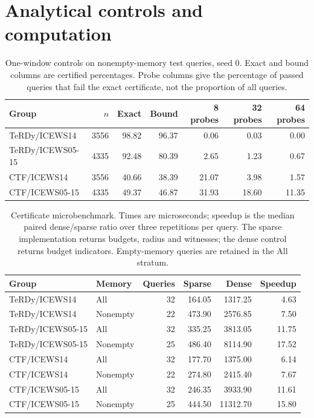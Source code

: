 \section{Analytical controls and computation}
\begin{table}[H]\centering\small\caption{One-window controls on nonempty-memory test queries, seed 0. Exact and bound columns are certified percentages. Probe columns give the percentage of passed queries that fail the exact certificate, not the proportion of all queries.}\begin{tabular}{lrrrrrr}\toprule Group & $n$ & Exact & Bound & 8 probes & 32 probes & 64 probes\\\midrule
TeRDy/ICEWS14 & 3556 & 98.82 & 96.37 & 0.06 & 0.03 & 0.00\\
TeRDy/ICEWS05-15 & 4335 & 92.48 & 80.39 & 2.65 & 1.23 & 0.67\\
CTF/ICEWS14 & 3556 & 40.66 & 38.39 & 21.07 & 3.98 & 1.57\\
CTF/ICEWS05-15 & 4335 & 49.37 & 46.87 & 31.93 & 18.60 & 11.35\\
\bottomrule\end{tabular}\end{table}
\begin{table}[H]\centering\small\caption{Certificate microbenchmark. Times are microseconds; speedup is the median paired dense/sparse ratio over three repetitions per query. The sparse implementation returns budgets, radius and witnesses; the dense control returns budget indicators. Empty-memory queries are retained in the All stratum.}\begin{tabular}{llrrrr}\toprule Group & Memory & Queries & Sparse & Dense & Speedup\\\midrule
TeRDy/ICEWS14 & All & 32 & 164.05 & 1317.25 & 4.63\\
TeRDy/ICEWS14 & Nonempty & 22 & 473.90 & 2576.85 & 7.50\\
TeRDy/ICEWS05-15 & All & 32 & 335.25 & 3813.05 & 11.75\\
TeRDy/ICEWS05-15 & Nonempty & 25 & 486.40 & 8114.90 & 17.52\\
CTF/ICEWS14 & All & 32 & 177.70 & 1375.00 & 6.14\\
CTF/ICEWS14 & Nonempty & 22 & 274.80 & 2415.40 & 7.67\\
CTF/ICEWS05-15 & All & 32 & 246.35 & 3933.90 & 11.61\\
CTF/ICEWS05-15 & Nonempty & 25 & 444.50 & 11312.70 & 15.80\\
\bottomrule\end{tabular}\end{table}
